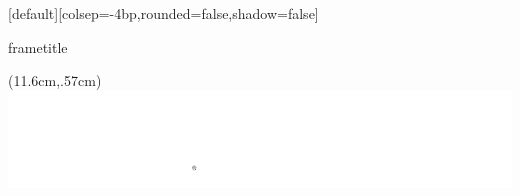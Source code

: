 

[default][colsep=-4bp,rounded=false,shadow=false]
{%
    \nointerlineskip%
    \begin{beamercolorbox}[wd=\paperwidth,ht=3.5ex,dp=0.6ex]{frametitle}
        \hspace*{1.3ex}\insertframetitle%
        
        \hspace*{1.3ex}\small\insertframesubtitle%
    \end{beamercolorbox}%
    \begin{textblock*}{100mm}(11.6cm,.57cm)
        \includegraphics[height=.8cm,keepaspectratio]{graph/Logo_GTCMT_white}
    \end{textblock*}
}


